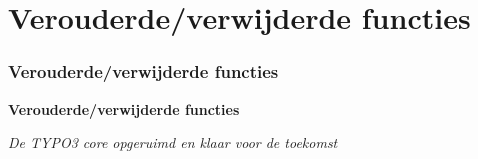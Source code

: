 %

\section{Verouderde/verwijderde functies}
\begin{frame}[fragile]
	\frametitle{Verouderde/verwijderde functies}

	\begin{center}\huge{\color{typo3darkgrey}\textbf{Verouderde/verwijderde functies}}\end{center}
	\begin{center}\large{\textit{De TYPO3 core opgeruimd en klaar voor de toekomst}}\end{center}

\end{frame}


